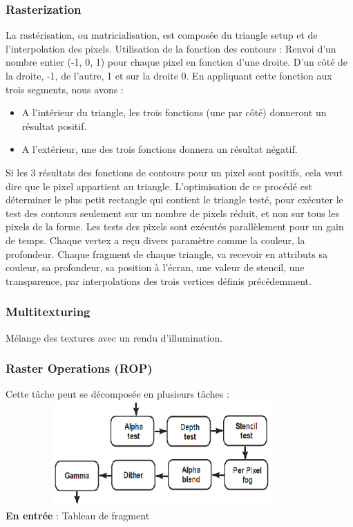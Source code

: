 \subsubsection{Rasterization}
La rastérisation, ou matricialisation, est composée du triangle setup et de l’interpolation des pixels.
Utilisation de la fonction des contours : Renvoi d’un nombre entier (-1, 0, 1) pour chaque pixel en fonction d’une droite. D’un côté de la droite, -1, de l’autre, 1 et sur la droite 0.
En appliquant cette fonction aux trois segments, nous avons :
\begin{itemize}
	\item A l'intérieur du triangle, les trois fonctions (une par côté) donneront un résultat positif.
	\item A l'extérieur, une des trois fonctions donnera un résultat négatif.
\end{itemize}
Si les 3 résultats des fonctions de contours pour un pixel sont positifs, cela veut dire que le pixel appartient au triangle.
L’optimisation de ce procédé est déterminer le plus petit rectangle qui contient le triangle testé, pour exécuter le test des contours seulement sur un nombre de pixels réduit, et non sur tous les pixels de la forme.
Les tests des pixels sont exécutés parallèlement pour un gain de temps.
Chaque vertex a reçu divers paramètre comme la couleur, la profondeur. Chaque fragment  de chaque triangle, va recevoir en attributs sa couleur, sa profondeur, sa position à l’écran, une valeur de stencil, une transparence, par interpolations des trois vertices définis précédemment.

\subsubsection{Multitexturing}
Mélange des textures avec un rendu d’illumination.

\subsubsection{Raster Operations (ROP)}
Cette tâche peut se décomposée en plusieurs tâches :\\
\includegraphics[width=12cm,height=40mm]{leo/images/rasterOp.png}\\
\textbf{En entrée} : Tableau de fragment


